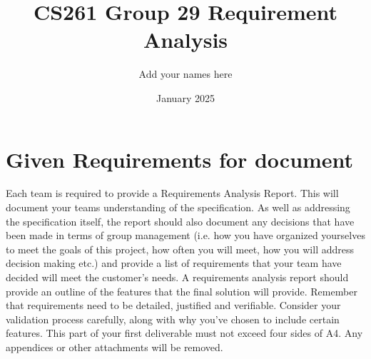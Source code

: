 \documentclass{article}
\title{CS261 Group 29 Requirement Analysis}
\author{Add your names here}
\date{January 2025}
\begin{document}
\maketitle
\tableofcontents

\section{Given Requirements for document}
Each team is required to provide a Requirements Analysis Report. This will document your teams understanding of the specification. As well as addressing the specification itself, the report should also document any decisions that have been made in terms of group management (i.e. how you have organized yourselves to meet the goals of this project, how often you will meet, how you will address decision making etc.) and provide a list of requirements that your team have decided will meet the customer's needs.
A requirements analysis report should provide an outline of the features that the final solution will provide. Remember that requirements need to be detailed, justified and verifiable. Consider your validation process carefully, along with why you've chosen to include certain features.
This part of your first deliverable must not exceed four sides of A4. Any appendices or other attachments will be removed.
\end{document}
